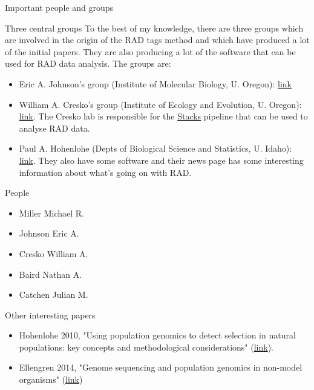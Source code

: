\documentclass[presentation]{beamer}
\begin{document}
\begin{frame}[label=sec-3]{Important people and groups}
\begin{block}{Three central groups}
To the best of my knowledge, there are three groups which are involved in the
origin of the RAD tags method and which have produced a lot of the initial
papers. They are also producing a lot of the software that can be used for RAD
data analysis. The groups are:
\begin{itemize}
\item Eric A. Johnson's group (Institute of Molecular Biology, U. Oregon): \href{http://molbio.uoregon.edu/johnson/}{link}
\item William A. Cresko's group (Institute of Ecology and Evolution, U. Oregon):
\href{http://creskolab.uoregon.edu/}{link}. The Cresko lab is responsible for the \href{http://creskolab.uoregon.edu/stacks/}{Stacks} pipeline that can be used
to analyse RAD data.
\item Paul A. Hohenlohe (Depts of Biological Science and Statistics, U. Idaho):
\href{http://webpages.uidaho.edu/hohenlohe/index.html}{link}. They also have some software and their news page has some interesting
information about what's going on with RAD.
\end{itemize}
\end{block}
\begin{block}{People}
\begin{itemize}
\item Miller Michael R.
\item Johnson Eric A.
\item Cresko William A.
\item Baird Nathan A.
\item Catchen Julian M.
\end{itemize}
\end{block}
\end{frame}
\begin{frame}[label=sec-4]{Other interesting papers}
\begin{itemize}
\item Hohenlohe 2010, "Using population genomics to detect selection in natural
populations: key concepts and methodological considerations" (\href{http://www.ncbi.nlm.nih.gov/pmc/articles/PMC3016716/}{link}).
\item Ellengren 2014, "Genome sequencing and population genomics in non-model
organisms" (\href{http://www.sciencedirect.com/science/article/pii/S0169534713002310}{link})
\end{itemize}
\end{frame}
\end{document}
